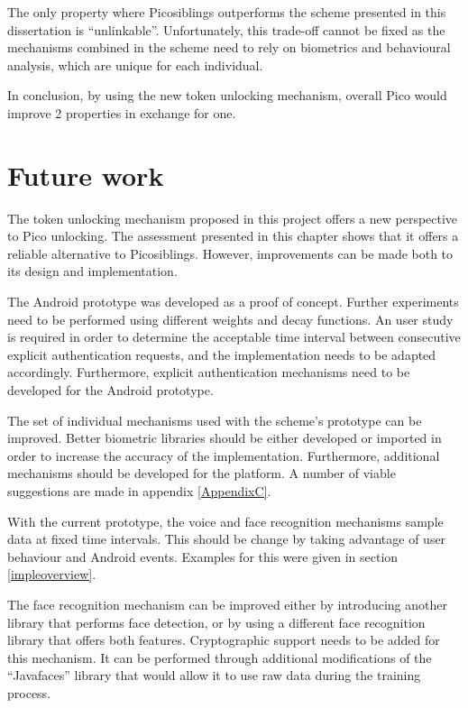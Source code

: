 The only property where Picosiblings outperforms the scheme presented in this dissertation is ``unlinkable''. Unfortunately, this trade-off cannot be fixed	as the mechanisms combined in the scheme need to rely on biometrics and behavioural analysis, which are unique for each individual. 

In conclusion, by using the new token unlocking mechanism, overall Pico would improve 2 properties in exchange for one.

\section{Future work}
The token unlocking mechanism proposed in this project offers a new perspective to Pico unlocking. The assessment presented in this chapter shows that it offers a reliable alternative to Picosiblings. However, improvements can be made both to its design and implementation.

The Android prototype was developed as a proof of concept. Further experiments need to be performed using different weights and decay functions. An user study is required in order to determine the acceptable time interval between consecutive explicit authentication requests, and the implementation needs to be adapted accordingly. Furthermore, explicit authentication mechanisms need to be developed for the Android prototype.

The set of individual mechanisms used with the scheme's prototype can be improved. Better biometric libraries should be either developed or imported in order to increase the accuracy of the implementation. Furthermore, additional mechanisms should be developed for the platform. A number of viable suggestions are made in appendix \ref{AppendixC}.

With the current prototype, the voice and face recognition mechanisms sample data at fixed time intervals. This should be change by taking advantage of user behaviour and Android events. Examples for this were given in section \ref{impleoverview}. 

The face recognition mechanism can be improved either by introducing another library that performs face detection, or by using a different face recognition library that offers both features. Cryptographic support needs to be added for this mechanism.  It can be performed through additional modifications of the ``Javafaces'' library that would allow it to use raw data during the training process.

